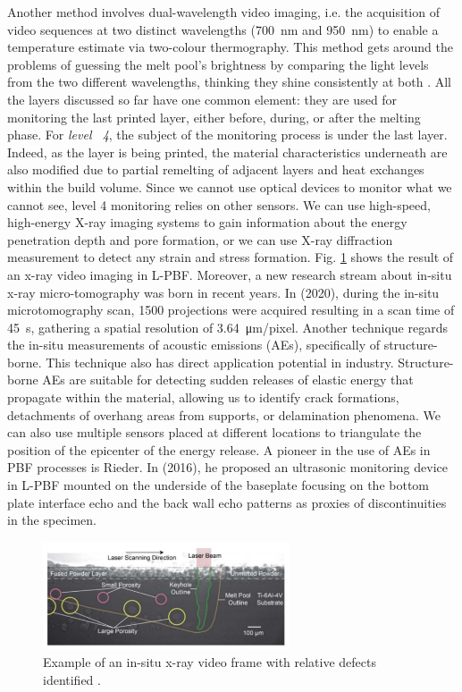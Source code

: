 Another method involves dual-wavelength video imaging, i.e. the acquisition of video sequences at two distinct wavelengths (\SI{700}{\nano\metre} and \SI{950}{\nano\metre}) to enable a temperature estimate via two-colour thermography. This method gets around the problems of guessing the melt pool's brightness by comparing the light levels from the two different wavelengths, thinking they shine consistently at both \cite{williams_situ_2019}.
All the layers discussed so far have one common element: they are used for monitoring the last printed layer, either before, during, or after the melting phase. For \emph{level ~4}, the subject of the monitoring process is under the last layer. Indeed, as the layer is being printed, the material characteristics underneath are also modified due to partial remelting of adjacent layers and heat exchanges within the build volume. Since we cannot use optical devices to monitor what we cannot see, level 4 monitoring relies on other sensors. We can use high-speed, high-energy X-ray imaging systems to gain information about the energy penetration depth and pore formation, or we can use X-ray diffraction measurement to detect any strain and stress formation. Fig. \ref{fig:xray4} shows the result of an x-ray video imaging in L-PBF. Moreover, a new research stream about in-situ x-ray micro-tomography was born in recent years. In \citeauthor{lhuissier_situ_2020} (2020), during the in-situ microtomography scan, 1500 projections were acquired resulting in a scan time of \SI{45}{s}, gathering a spatial resolution of \SI{3.64}{\micro\metre / pixel}. Another technique regards the in-situ measurements of acoustic emissions (AEs), specifically of structure-borne. This technique also has direct application potential in industry. Structure-borne AEs are suitable for detecting sudden releases of elastic energy that propagate within the material, allowing us to identify crack formations, detachments of overhang areas from supports, or delamination phenomena. We can also use multiple sensors placed at different locations to triangulate the position of the epicenter of the energy release. A pioneer in the use of AEs in PBF processes is Rieder. In \citeauthor{rieder_-_2016} (2016), he proposed an ultrasonic monitoring device in L-PBF mounted on the underside of the baseplate focusing on the bottom plate interface echo and the back wall echo patterns as proxies of discontinuities in the specimen.
\begin{figure}
    \centering
    \includegraphics[width=0.65\textwidth]{Images/xray4.png}
    \caption[X-ray video frame.]{Example of an in-situ x-ray video frame with relative defects identified \cite{paulson_correlations_2020}.}
    \label{fig:xray4}
\end{figure}

